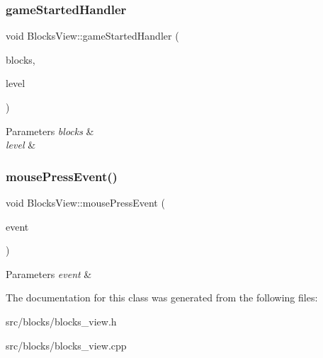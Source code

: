 \subsubsection{\texorpdfstring{gameStartedHandler}{gameStartedHandler}}
{\footnotesize\ttfamily void Blocks\+View\+::game\+Started\+Handler (\begin{DoxyParamCaption}\item[{const std\+::vector$<$ std\+::shared\+\_\+ptr$<$ \mbox{\hyperlink{class_block}{Block}}$<$ \mbox{\hyperlink{class_block_layout_item}{Block\+Layout\+Item}} $>$$>$$>$ \&}]{blocks,  }\item[{const size\+\_\+t \&}]{level }\end{DoxyParamCaption})\hspace{0.3cm}{\ttfamily [slot]}}


\begin{DoxyParams}{Parameters}
{\em blocks} & \\
\hline
{\em level} & \\
\hline
\end{DoxyParams}
\mbox{\label{class_blocks_view_a9131c975ebe8b9c6933890bb9d9b0848}} 
\subsubsection{\texorpdfstring{mousePressEvent()}{mousePressEvent()}}
{\footnotesize\ttfamily void Blocks\+View\+::mouse\+Press\+Event (\begin{DoxyParamCaption}\item[{Q\+Mouse\+Event $\ast$}]{event }\end{DoxyParamCaption})\hspace{0.3cm}{\ttfamily [protected]}}


\begin{DoxyParams}{Parameters}
{\em event} & \\
\hline
\end{DoxyParams}


The documentation for this class was generated from the following files\+:\begin{DoxyCompactItemize}
\item 
src/blocks/blocks\+\_\+view.\+h\item 
src/blocks/blocks\+\_\+view.\+cpp\end{DoxyCompactItemize}
